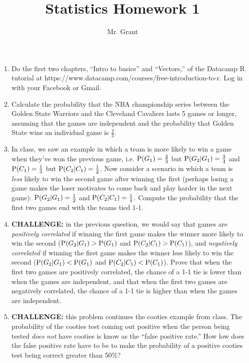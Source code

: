 \documentclass[12pt]{article}
\newcommand{\Pp}{\emph{\emph{P}}}
\begin{document}
\title{Statistics Homework 1}
\author{Mr. Grant}
\maketitle

\begin{enumerate}
	\item Do the first two chapters, ``Intro to basics'' and ``Vectors,'' of the Datacamp R tutorial at https://www.datacamp.com/courses/free-introduction-to-r. Log in with your Facebook or Gmail.
	\item Calculate the probability that the NBA championship series between the Golden State Warriors and the Cleveland Cavaliers lasts 5 games or longer, assuming that the games are independent and the probability that Golden State wins an individual game is $\frac{2}{3}$.
	\item In class, we saw an example in which a team is more likely to win a game when they've won the previous game, i.e. $\Pp(G_1) = \frac{2}{3}$ but $\Pp(G_2 | G_1) = \frac{3}{4}$ and $\Pp(C_1) = \frac{1}{3}$ but $\Pp(C_2 | C_1) = \frac{1}{2}$. Now consider a scenario in which a team is \textit{less} likely to win the second game after winning the first (perhaps losing a game makes the loser motivates to come back and play harder in the next game): $\Pp(G_2 | G_1) = \frac{1}{2}$ and $\Pp(C_2 | C_1) = \frac{1}{4}$. Compute the probability that the first two games end with the teams tied 1-1.
	\item \textbf{CHALLENGE:} in the previous question, we would say that games are \textit{positively correlated} if winning the first game makes the winner more likely to win the second ($\Pp(G_2 | G_1) > \Pp(G_1)$ and $\Pp(C_2 | C_1) > \Pp(C_1)$), and \textit{negatively correlated} if winning the first game makes the winner less likely to win the second ($\Pp(G_2 | G_1) < \Pp(G_1)$ and $\Pp(C_2 | C_1) < \Pp(C_1)$). Prove that when the first two games are positively correlated, the chance of a 1-1 tie is lower than when the games are independent, and that when the first two games are negatively correlated, the chance of a 1-1 tie is higher than when the games are independent.
	\item \textbf{CHALLENGE:} this problem continues the cooties example from class. The probability of the cooties test coming out positive when the person being tested \textit{does not} have cooties is know as the ``false positive rate.'' How low does the false positive rate have to be to make the probability of a positive cooties test being correct greater than 50\%?
\end{enumerate}
\end{document}
